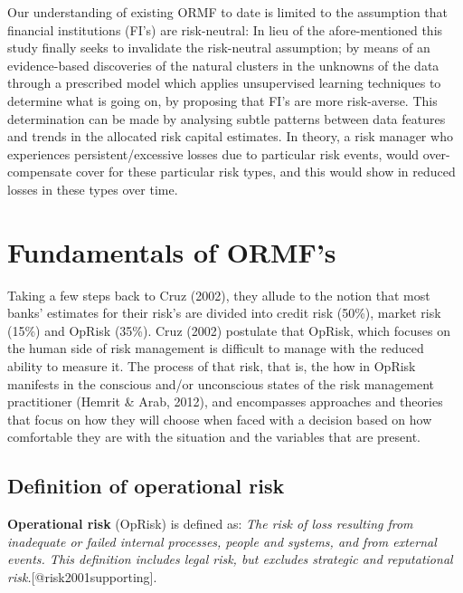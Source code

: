 \documentclass{DissertateUSU}
\begin{document}
Our understanding of existing ORMF to date is limited to the assumption
that financial institutions (FI's) are risk-neutral: In lieu of the
afore-mentioned this study finally seeks to invalidate the risk-neutral
assumption; by means of an evidence-based discoveries of the natural
clusters in the unknowns of the data through a prescribed model which
applies unsupervised learning techniques to determine what is going on,
by proposing that FI's are more risk-averse. This determination can be
made by analysing subtle patterns between data features and trends in
the allocated risk capital estimates. In theory, a risk manager who
experiences persistent/excessive losses due to particular risk events,
would over-compensate cover for these particular risk types, and this
would show in reduced losses in these types over time.

\section{Fundamentals of ORMF's}
\label{sec:Fundamentals of ORMF's}

Taking a few steps back to Cruz (2002), they allude to the notion that
most banks' estimates for their risk's are divided into credit risk
(50\%), market risk (15\%) and OpRisk (35\%). Cruz (2002) postulate that
OpRisk, which focuses on the human side of risk management is difficult
to manage with the reduced ability to measure it. The process of that
risk, that is, the how in OpRisk manifests in the conscious and/or
unconscious states of the risk management practitioner (Hemrit \& Arab,
2012), and encompasses approaches and theories that focus on how they
will choose when faced with a decision based on how comfortable they are
with the situation and the variables that are present.

\subsection{Definition of operational risk}
\label{ssec:Definition of operational risk}

\begin{definition}
\textbf{Operational risk} (OpRisk) is defined as: \emph{The risk of loss resulting from inadequate or failed internal processes, people and systems, and from external events. This definition includes legal risk, but excludes strategic and reputational risk.}[@risk2001supporting].\medskip
\end{definition}
\end{document}

